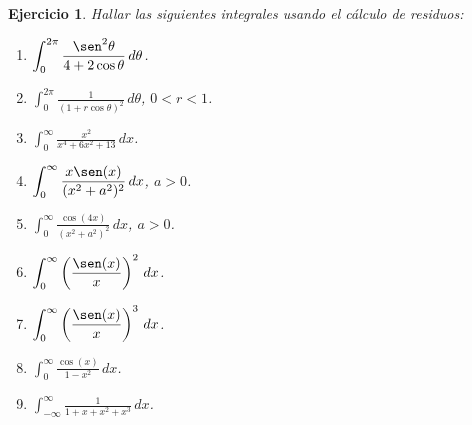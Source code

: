 \documentclass[11pt]{report}
\newtheorem{ejercicio}{Ejercicio}
\begin{document}
\begin{ejercicio}
  Hallar las siguientes integrales usando el cálculo de residuos:
  \begin{multicols}{2}
  \begin{enumerate}
    \item $\displaystyle \int_{0}^{2\pi} \frac{\sen^2 \theta}{4+2\cos\theta} \, d\theta$.
    \item $\displaystyle \int_0^{2\pi} \frac{1}{(1+r\cos\theta)^2} \, d\theta$, $0<r<1$.
    \item $\displaystyle \int_0^\infty \frac{x^2}{x^4+6x^2+13} \, dx$.
    \item $\displaystyle \int_0^\infty \frac{x\sen(x)}{(x^2+a^2)^2} \, dx$, $a>0$.
    \item $\displaystyle \int_0^\infty\frac{\cos(4x)}{(x^2+a^2)^2} \, dx$, $a>0$.
    \item $\displaystyle \int_0^\infty \left(\frac{\sen(x)}{x}\right)^2 \, dx$.
    \item $\displaystyle \int_0^\infty \left(\frac{\sen(x)}{x}\right)^3 \, dx$.
    \item $\displaystyle \int_0^\infty \frac{\cos(x)}{1-x^2} \, dx$.
    \item $\displaystyle \int_{-\infty}^\infty \frac{1}{1+x+x^2+x^3} \, dx$.
  \end{enumerate}
  \end{multicols}
\end{ejercicio}
\end{document}
